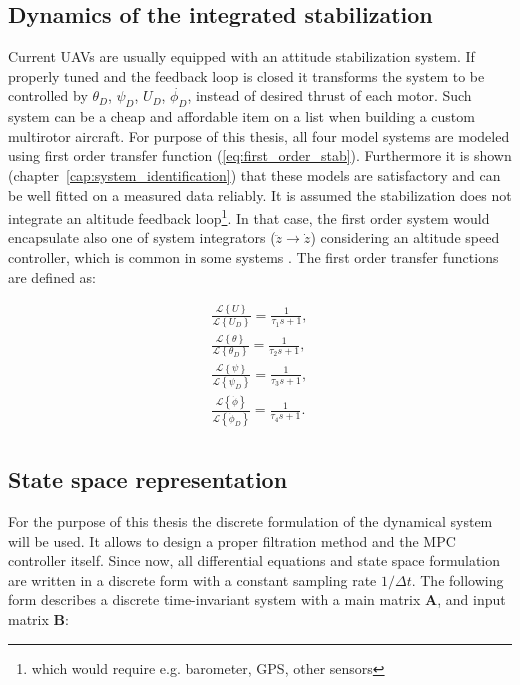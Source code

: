 \subsection{Dynamics of the integrated stabilization}

Current UAVs are usually equipped with an attitude stabilization system. If properly tuned and the feedback loop is closed it transforms the system to be controlled by $\theta_D$, $\psi_D$, $U_D$, $\dot{\phi_D}$, instead of desired thrust of each motor. Such system can be a cheap and affordable item on a list when building a custom multirotor aircraft. For purpose of this thesis, all four model systems are modeled using first order transfer function (\ref{eq:first_order_stab}). Furthermore it is shown (chapter~\ref{cap:system_identification}) that these models are satisfactory and can be well fitted on a measured data reliably. It is assumed the stabilization does not integrate an altitude feedback loop\footnote{which would require e.g. barometer, GPS, other sensors}. In that case, the first order system would encapsulate also one of system integrators ($\ddot{z} \rightarrow \dot{z}$) considering an altitude speed controller, which is common in some systems \citep{pixhawk}\cite{ardupilot}. The first order transfer functions are defined as:

\begin{equation}
\begin{split}
\frac{\mathcal{L}\left\lbrace U \right\rbrace}{\mathcal{L}\left\lbrace U_D \right\rbrace} = \frac{1}{\tau_1 s + 1},\\
\frac{\mathcal{L}\left\lbrace \theta \right\rbrace}{\mathcal{L}\left\lbrace \theta_D \right\rbrace} = \frac{1}{\tau_2 s + 1},\\
\frac{\mathcal{L}\left\lbrace \psi \right\rbrace}{\mathcal{L}\left\lbrace \psi_D \right\rbrace} = \frac{1}{\tau_3 s + 1},\\
\frac{\mathcal{L}\left\lbrace \dot{\phi} \right\rbrace}{\mathcal{L}\left\lbrace \dot{\phi}_D \right\rbrace} = \frac{1}{\tau_4 s + 1}.\\
\end{split}
\label{eq:first_order_stab}
\end{equation}

\subsection{State space representation}

For the purpose of this thesis the discrete formulation of the dynamical system will be used. It allows to design a proper filtration method and the MPC controller itself. Since now, all differential equations and state space formulation are written in a discrete form with a constant sampling rate $1/\Delta t$. The following form describes a discrete time-invariant system with a main matrix $\mathbf{A}$, and input matrix $\mathbf{B}$:

